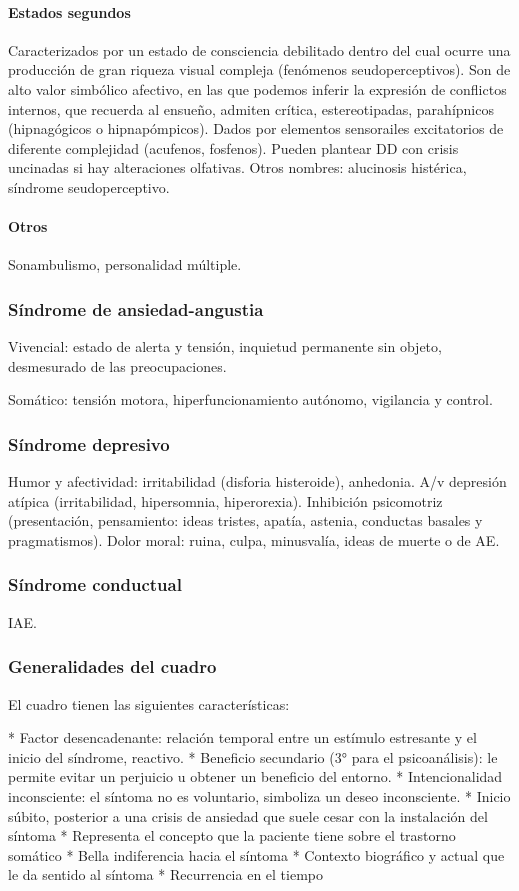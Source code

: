 \documentclass{scrbook}
\begin{document}
\paragraph{Estados segundos}
Caracterizados por un estado de consciencia debilitado dentro del cual ocurre una producción de gran riqueza visual compleja (fenómenos seudoperceptivos). Son de alto valor simbólico afectivo, en las que podemos inferir la expresión de conflictos internos, que recuerda al ensueño, admiten crítica, estereotipadas, parahípnicos (hipnagógicos o hipnapómpicos). Dados por elementos sensorailes excitatorios de diferente complejidad (acufenos, fosfenos). Pueden plantear DD con crisis uncinadas si hay alteraciones olfativas.
Otros nombres: alucinosis histérica, síndrome seudoperceptivo.
\paragraph{Otros}
Sonambulismo, personalidad múltiple.
\subsubsection*{Síndrome de ansiedad-angustia}
Vivencial: estado de alerta y tensión, inquietud permanente sin objeto, desmesurado de las preocupaciones.

Somático: tensión motora, hiperfuncionamiento autónomo, vigilancia y control.
\subsubsection*{Síndrome depresivo}
Humor y afectividad: irritabilidad (disforia histeroide), anhedonia. A/v depresión atípica (irritabilidad, hipersomnia, hiperorexia). Inhibición psicomotriz (presentación, pensamiento: ideas tristes, apatía, astenia, conductas basales y pragmatismos). Dolor moral: ruina, culpa, minusvalía, ideas de muerte o de AE.
\subsubsection*{Síndrome conductual}
IAE.
\subsubsection*{Generalidades del cuadro}
El cuadro tienen las siguientes características:

* Factor desencadenante: relación temporal entre un estímulo estresante y el inicio del síndrome, reactivo.
* Beneficio secundario (3° para el psicoanálisis): le permite evitar un perjuicio u obtener un beneficio del entorno.
* Intencionalidad inconsciente: el síntoma no es voluntario, simboliza un deseo inconsciente.
* Inicio súbito, posterior a una crisis de ansiedad que suele cesar con la instalación del síntoma
* Representa el concepto que la paciente tiene sobre el trastorno somático
* Bella indiferencia hacia el síntoma
* Contexto biográfico y actual que le da sentido al síntoma
* Recurrencia en el tiempo
\end{document}
